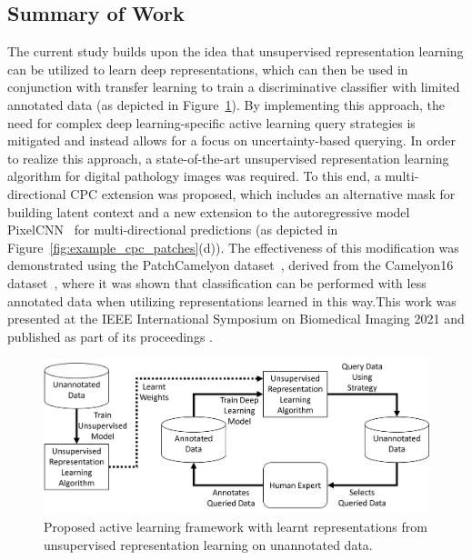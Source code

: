 \subsection{Summary of Work}
\label{subsec:unsupervised_summary}
The current study builds upon the idea that unsupervised representation learning can be utilized to learn deep representations, which can then be used in conjunction with transfer learning to train a discriminative classifier with limited annotated data (as depicted in Figure~\ref{fig:active_unsupervised_learning_framework}). By implementing this approach, the need for complex deep learning-specific active learning query strategies is mitigated and instead allows for a focus on uncertainty-based querying. In order to realize this approach, a state-of-the-art unsupervised representation learning algorithm for digital pathology images was required. To this end, a multi-directional CPC extension was proposed, which includes an alternative mask for building latent context and a new extension to the autoregressive model PixelCNN~\citep{oord2016pixel} for multi-directional predictions (as depicted in Figure~\ref{fig:example_cpc_patches}(d)). The effectiveness of this modification was demonstrated using the PatchCamelyon dataset~\citep{veeling2018rotation}, derived from the Camelyon16 dataset~\citep{litjens20181399}, where it was shown that classification can be performed with less annotated data when utilizing representations learned in this way.This work was presented at the IEEE International Symposium on Biomedical Imaging 2021 and published as part of its proceedings \citep{carse2021unsupervised}.

\begin{figure}
	\centering
	\includegraphics[width=\textwidth]{images/active_unsupervised_learning.png}
	\caption{Proposed active learning framework with learnt representations from unsupervised representation learning on unannotated data.}
	\label{fig:active_unsupervised_learning_framework}
\end{figure}



